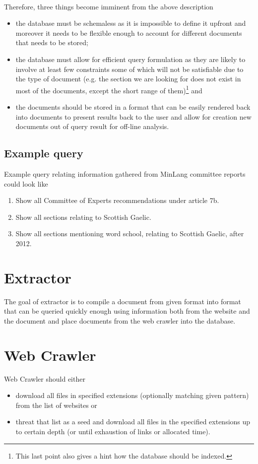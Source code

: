 \documentclass[a4paper]{tufte-book}
\begin{document}
\paragraph{}
Therefore, three things become imminent from the above description
\begin{itemize}
  \item the database must be schemaless as it is impossible to define it upfront and moreover it needs to be flexible enough to account for different documents that needs to be stored;
  \item the database must allow for efficient query formulation as they are likely to involve at least few constraints some of which will not be satisfiable due to the type of document (e.g. the section we are looking for does not exist in most of the documents, except the short range of them)\footnote{This last point also gives a hint how the database should be indexed.} and
  \item the documents should be stored in a format that can be easily rendered back into documents to present results back to the user and allow for creation new documents out of query result for off-line analysis.
\end{itemize}

\subsection{Example query}
Example query relating information gathered from MinLang committee reports could look like
\begin{enumerate}
  \item Show all Committee of Experts recommendations under article 7b.
  \item Show all sections relating to Scottish Gaelic.
  \item Show all sections mentioning word school, relating to Scottish Gaelic, after 2012.
\end{enumerate}

\section{Extractor}
The goal of extractor is to compile a document from given format into format that can be queried quickly enough using information both from the website and the document and place documents from the web crawler into the database.

\section{Web Crawler}
Web Crawler should either
\begin{itemize}
  \item download all files in specified extensions (optionally matching given pattern) from the list of websites or
  \item threat that list as a seed and download all files in the specified extensions up to certain depth (or until exhaustion of links or allocated time).
\end{itemize}
\end{document}
